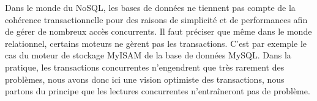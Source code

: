 	Dans le monde du NoSQL, les bases de données ne tiennent pas compte de la cohérence transactionnelle pour des raisons de simplicité et de performances afin de gérer de nombreux accès concurrents. Il faut préciser que même dans le monde relationnel, certains moteurs ne gèrent pas les transactions. C'est par exemple le cas du moteur de stockage MyISAM de la base de données MySQL. Dans la pratique, les transactions concurrentes n'engendrent que très rarement des problèmes, nous avons donc ici une vision optimiste des transactions, nous partons du principe que les lectures concurrentes n'entraîneront pas de problème.
